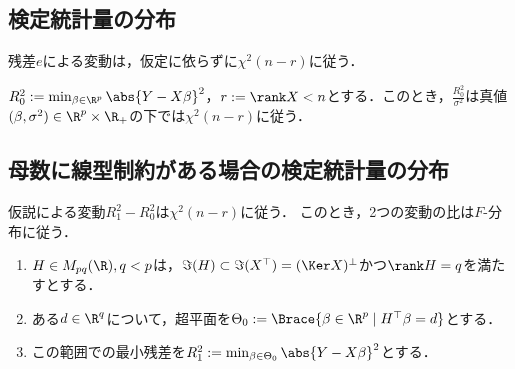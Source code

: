 \documentclass[uplatex,dvipdfmx]{jsreport}
\begin{document}
\subsection{検定統計量の分布}

\begin{tcolorbox}[colframe=ForestGreen, colback=ForestGreen!10!white,breakable,colbacktitle=ForestGreen!40!white,coltitle=black,fonttitle=\bfseries\sffamily,
title=]
    残差$e$による変動は，仮定に依らずに$\chi^2(n-r)$に従う．
\end{tcolorbox}

\begin{theorem}
    $R^2_0:=\min_{\beta\in\R^p}\abs{Y-X\beta}^2$，$r:=\rank X<n$とする．このとき，$\frac{R^2_0}{\sigma^2}$は真値$(\beta,\sigma^2)\in\R^p\times\R_+$の下では$\chi^2(n-r)$に従う．
\end{theorem}

\subsection{母数に線型制約がある場合の検定統計量の分布}

\begin{tcolorbox}[colframe=ForestGreen, colback=ForestGreen!10!white,breakable,colbacktitle=ForestGreen!40!white,coltitle=black,fonttitle=\bfseries\sffamily,
title=]
    仮説による変動$R^2_1-R^2_0$は$\chi^2(n-r)$に従う．
    このとき，2つの変動の比は$F$-分布に従う．
\end{tcolorbox}

\begin{notation}\mbox{}
    \begin{enumerate}
        \item $H\in M_{pq}(\R),q<p$は，$\Im(H)\subset\Im(X^\top)=(\Ker X)^\perp$かつ$\rank H=q$を満たすとする．
        \item ある$d\in\R^q$について，超平面を$\Theta_0:=\Brace{\beta\in\R^p\mid H^\top\beta=d}$とする．
        \item この範囲での最小残差を$R^2_1:=\min_{\beta\in\Theta_0}\abs{Y-X\beta}^2$とする．
    \end{enumerate}
\end{notation}
\end{document}
